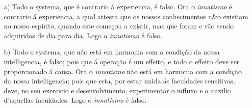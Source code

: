 

a) Todo o systema, que é contrario á experiencia, é falso. Ora o \emph{innatismo} é contrario á experiencia, a qual attesta que os nossos conhecimentos n\&o existiam no nosso espirito, quando este começou a existir, mas que foram e vão sendo adquiridos de dia para dia. Logo o \emph{innatismo} é falso.

b) Todo o systema, que não está em harmonia com a condição   da nossa intelligencia, é falso; pois que á operação é um effeito, e todo o effeito deve ser proporcionado á causa. Ora o \emph{innatismo} não está em harmonia com a condição da nossa intelligencia; pois que esta, por estar unida ás faculdades sensitivas, deve, no seu exercicio e desenvolvimento, experimentar o influxo e o auxilio d'aquellas faculdades. Logo o \emph{innatismo} é falso.


